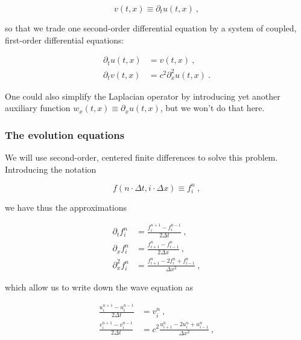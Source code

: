 \documentclass[a4paper,11pt]{article}
\begin{document}
\begin{equation}
v(t,x) \equiv \partial_{t}u(t,x)\ ,
\end{equation}

\noindent so that we trade one second-order differential equation by a system of coupled, first-order differential equations:

\begin{equation}
\begin{aligned}
\partial_{t}u(t,x) &= v(t,x)\ ,\\
\partial_{t}v(t,x) &= c^{2}\partial_{x}^{2}u(t,x)\ .
\end{aligned}
\end{equation}

\noindent One could also simplify the Laplacian operator by introducing yet another auxiliary function $w_{x}(t,x)\equiv\partial_{x}u(t,x)$, but we won't do that here.

\subsubsection{The evolution equations}

We will use second-order, centered finite differences to solve this problem. Introducing the notation

\begin{equation}
f\left(n\cdot\Delta t,i\cdot\Delta x\right) \equiv f^{n}_{i}\ ,
\end{equation}

\noindent we have thus the approximations

\begin{equation}
\begin{aligned}
\partial_{t}f^{n}_{i}     &= \frac{f^{n+1}_{i}-f^{n-1}_{i}}{2\Delta t}           \ ,\\
\partial_{x}f^{n}_{i}     &= \frac{f^{n}_{i+1}-f^{n}_{i-1}}{2\Delta x}           \ ,\\
\partial_{x}^{2}f^{n}_{i} &= \frac{f^{n}_{i+1}-2f^{n}_{i}+f^{n}_{i-1}}{\Delta x^{2}}\ ,
\end{aligned}
\end{equation}

\noindent which allow us to write down the wave equation as

\begin{equation}
\begin{aligned}
\frac{u^{n+1}_{i}-u^{n-1}_{i}}{2\Delta t} &= v^{n}_{i}\ ,\\
\frac{v^{n+1}_{i}-v^{n-1}_{i}}{2\Delta t} &= c^{2}\frac{u^{n}_{i+1}-2u^{n}_{i}+u^{n}_{i-1}}{\Delta x^{2}}\ ,
\end{aligned}
\end{equation}
\end{document}

